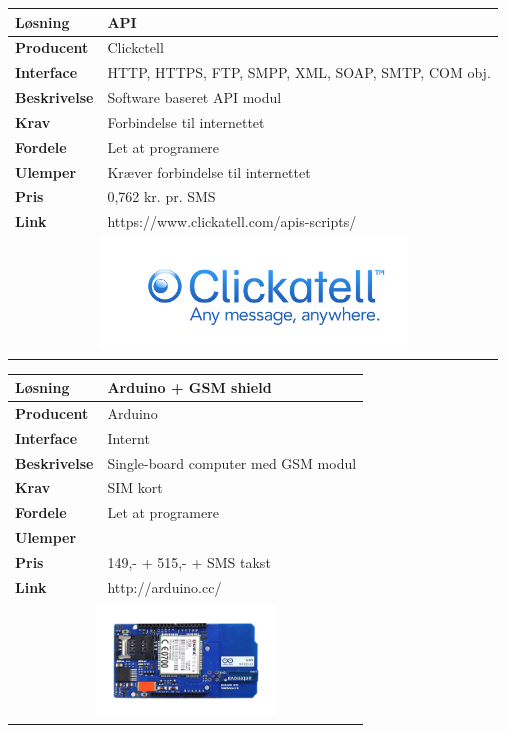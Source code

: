 \begin{table}[H] \centering
	\label{tab:GSM2}
\begin{tabular}{|p{6cm}|p{8cm}|}
	\hline
		\textbf{Løsning}				&API \\ \hline
		\textbf{Producent} 			&Clickctell \\ \hline
		\textbf{Interface} 			&HTTP, HTTPS, FTP, SMPP, XML, SOAP, SMTP, COM obj.\\ \hline
		\textbf{Beskrivelse} 		&Software baseret API modul \\ \hline
		\textbf{Krav} 				&Forbindelse til internettet \\ \hline
		\textbf{Fordele}				&Let at programere \\ \hline
		\textbf{Ulemper} 			&Kræver forbindelse til internettet \\ \hline
		\textbf{Pris} 				&0,762 kr. pr. SMS \\ \hline
		\textbf{Link} 				&https://www.clickatell.com/apis-scripts/ \\ \hline	
		\multicolumn{2}{|c|}{
			\includegraphics[height=3cm]{billeder/GSM_Clickatell}} \\ \hline	
\end{tabular}
\end{table}

\begin{table}[H] \centering
	\label{tab:GSM3}
\begin{tabular}{|p{6cm}|p{8cm}|}
	\hline
		\textbf{Løsning}				&Arduino + GSM shield \\ \hline
		\textbf{Producent} 			&Arduino \\ \hline
		\textbf{Interface} 			&Internt \\ \hline
		\textbf{Beskrivelse} 		&Single-board computer med GSM modul\\ \hline
		\textbf{Krav} 				&SIM kort \\ \hline
		\textbf{Fordele}				&Let at programere \\ \hline
		\textbf{Ulemper} 			&\\ \hline
		\textbf{Pris} 				&149,- + 515,- + SMS takst\\ \hline
		\textbf{Link} 				&http://arduino.cc/ \\ \hline		
		\multicolumn{2}{|c|}{
			\includegraphics[height=3cm]{billeder/GSM_Arduino}} \\ \hline	
\end{tabular}
\end{table}